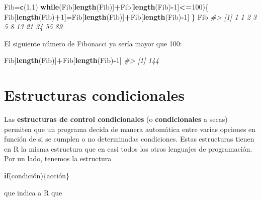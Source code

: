 \documentclass[
]{book}
\newenvironment{Shaded}{\begin{snugshade}}{\end{snugshade}}
\newcommand{\CommentTok}[1]{\textcolor[rgb]{0.56,0.35,0.01}{\textit{#1}}}
\newcommand{\ControlFlowTok}[1]{\textcolor[rgb]{0.13,0.29,0.53}{\textbf{#1}}}
\newcommand{\DecValTok}[1]{\textcolor[rgb]{0.00,0.00,0.81}{#1}}
\newcommand{\KeywordTok}[1]{\textcolor[rgb]{0.13,0.29,0.53}{\textbf{#1}}}
\newcommand{\NormalTok}[1]{#1}
\newcommand{\OperatorTok}[1]{\textcolor[rgb]{0.81,0.36,0.00}{\textbf{#1}}}
\theoremstyle{definition}
\theoremstyle{definition}
\theoremstyle{definition}
\theoremstyle{remark}
\begin{document}
\begin{Shaded}
\begin{Highlighting}[]
\NormalTok{Fib=}\KeywordTok{c}\NormalTok{(}\DecValTok{1}\NormalTok{,}\DecValTok{1}\NormalTok{) }
\ControlFlowTok{while}\NormalTok{(Fib[}\KeywordTok{length}\NormalTok{(Fib)]}\OperatorTok{+}\NormalTok{Fib[}\KeywordTok{length}\NormalTok{(Fib)}\OperatorTok{{-}}\DecValTok{1}\NormalTok{]}\OperatorTok{\textless{}=}\DecValTok{100}\NormalTok{)\{}
\NormalTok{  Fib[}\KeywordTok{length}\NormalTok{(Fib)}\OperatorTok{+}\DecValTok{1}\NormalTok{]=Fib[}\KeywordTok{length}\NormalTok{(Fib)]}\OperatorTok{+}\NormalTok{Fib[}\KeywordTok{length}\NormalTok{(Fib)}\OperatorTok{{-}}\DecValTok{1}\NormalTok{] }
\NormalTok{  \} }
\NormalTok{Fib}
\CommentTok{\#\textgreater{}  [1]  1  1  2  3  5  8 13 21 34 55 89}
\end{Highlighting}
\end{Shaded}

El siguiente número de Fibonacci ya sería mayor que 100:

\begin{Shaded}
\begin{Highlighting}[]
\NormalTok{Fib[}\KeywordTok{length}\NormalTok{(Fib)]}\OperatorTok{+}\NormalTok{Fib[}\KeywordTok{length}\NormalTok{(Fib)}\OperatorTok{{-}}\DecValTok{1}\NormalTok{]}
\CommentTok{\#\textgreater{} [1] 144}
\end{Highlighting}
\end{Shaded}

\hypertarget{estructuras-condicionales}{%
\section{Estructuras condicionales}\label{estructuras-condicionales}}

Las \textbf{estructuras de control condicionales} (o \textbf{condicionales} a secas) permiten que un programa decida de manera automática entre varias opciones en función de si se cumplen o no determinadas condiciones. Estas estructuras tienen en R la misma estructura que en casi todos los otros lenguajes de programación. Por un lado, tenemos la estructura

\begin{Shaded}
\begin{Highlighting}[]
\ControlFlowTok{if}\NormalTok{(condición)\{acción\}}
\end{Highlighting}
\end{Shaded}

que indica a R que
\end{document}
